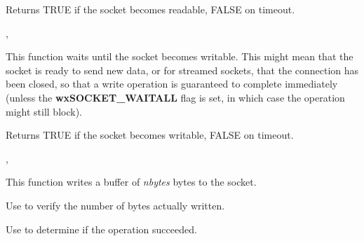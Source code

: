 
Returns TRUE if the socket becomes readable, FALSE on timeout.


, 

%
%
\label{wxsocketbasewaitforwrite}


This function waits until the socket becomes writable. This might mean that
the socket is ready to send new data, or for streamed sockets, that the
connection has been closed, so that a write operation is guaranteed to
complete immediately (unless the {\bf wxSOCKET\_WAITALL} flag is set,
in which case the operation might still block).





Returns TRUE if the socket becomes writable, FALSE on timeout.


, 

%
%
\label{wxsocketbasewrite}


This function writes a buffer of {\it nbytes} bytes to the socket.

Use  to verify the number of bytes actually written.

Use  to determine if the operation succeeded.




